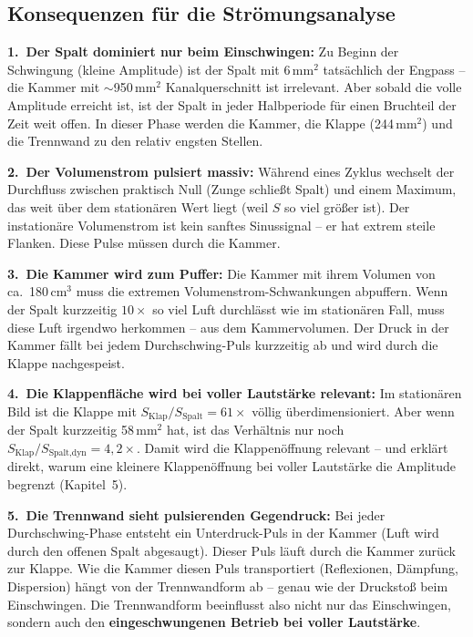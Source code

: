 \documentclass[11pt,a4paper]{article}
\begin{document}
\subsection{Konsequenzen für die Strömungsanalyse}

\textbf{1.\ Der Spalt dominiert nur beim Einschwingen:} Zu Beginn der Schwingung (kleine Amplitude) ist der Spalt mit 6\,mm$^2$ tatsächlich der Engpass -- die Kammer mit $\sim$950\,mm$^2$ Kanalquerschnitt ist irrelevant. Aber sobald die volle Amplitude erreicht ist, ist der Spalt in jeder Halbperiode für einen Bruchteil der Zeit weit offen. In dieser Phase werden die Kammer, die Klappe (244\,mm$^2$) und die Trennwand zu den relativ engsten Stellen.

\textbf{2.\ Der Volumenstrom pulsiert massiv:} Während eines Zyklus wechselt der Durchfluss zwischen praktisch Null (Zunge schließt Spalt) und einem Maximum, das weit über dem stationären Wert liegt (weil $S$ so viel größer ist). Der instationäre Volumenstrom ist kein sanftes Sinussignal -- er hat extrem steile Flanken. Diese Pulse müssen durch die Kammer.

\textbf{3.\ Die Kammer wird zum Puffer:} Die Kammer mit ihrem Volumen von ca.\ 180\,cm$^3$ muss die extremen Volumenstrom-Schwankungen abpuffern. Wenn der Spalt kurzzeitig $10\times$ so viel Luft durchlässt wie im stationären Fall, muss diese Luft irgendwo herkommen -- aus dem Kammervolumen. Der Druck in der Kammer fällt bei jedem Durchschwing-Puls kurzzeitig ab und wird durch die Klappe nachgespeist.

\begin{keybox}
\textbf{4.\ Die Klappenfläche wird bei voller Lautstärke relevant:} Im stationären Bild ist die Klappe mit $S_\text{Klap}/S_\text{Spalt} = 61\times$ völlig überdimensioniert. Aber wenn der Spalt kurzzeitig 58\,mm$^2$ hat, ist das Verhältnis nur noch $S_\text{Klap}/S_\text{Spalt,dyn} = 4{,}2\times$. Damit wird die Klappenöffnung relevant -- und erklärt direkt, warum eine kleinere Klappenöffnung bei voller Lautstärke die Amplitude begrenzt (Kapitel~5).
\end{keybox}

\textbf{5.\ Die Trennwand sieht pulsierenden Gegendruck:} Bei jeder Durchschwing-Phase entsteht ein Unterdruck-Puls in der Kammer (Luft wird durch den offenen Spalt abgesaugt). Dieser Puls läuft durch die Kammer zurück zur Klappe. Wie die Kammer diesen Puls transportiert (Reflexionen, Dämpfung, Dispersion) hängt von der Trennwandform ab -- genau wie der Druckstoß beim Einschwingen. Die Trennwandform beeinflusst also nicht nur das Einschwingen, sondern auch den \textbf{eingeschwungenen Betrieb bei voller Lautstärke}.
\end{document}
